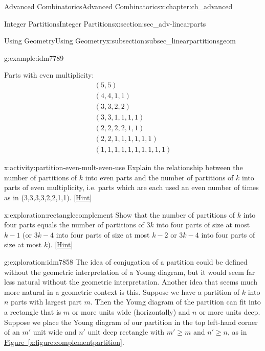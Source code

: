 \documentclass[oneside,10pt,]{book}
\numberwithin{equation}{chapter}
\begin{document}
\begin{chapterptx}{Advanced Combinatorics}{}{Advanced Combinatorics}{}{}{x:chapter:ch_advanced}
\begin{sectionptx}{Integer Partitions}{}{Integer Partitions}{}{}{x:section:sec_adv-linearparts}
\begin{subsectionptx}{Using Geometry}{}{Using Geometry}{}{}{x:subsection:subsec_linearpartitionsgeom}
\begin{introduction}{}
\begin{example}{}{g:example:idm7789}
\begin{sidebyside}{3}{0.0166666666666667}{0.0166666666666667}{0.0333333333333333}
\begin{sbspanel}{0.3}%
\par
Parts with even multiplicity:%
\begin{gather*}
(5,5) \\
(4,4,1,1) \\
(3,3,2,2) \\
(3,3,1,1,1,1) \\
(2,2,2,2,1,1) \\
(2,2,1,1,1,1,1,1) \\
(1,1,1,1,1,1,1,1,1,1) 
\end{gather*}
%
\end{sbspanel}%
\end{sidebyside}%
\end{example}
\begin{activity}{}{x:activity:partition-even-mult-even-use}%
Explain the relationship between the number of partitions of \(k\) into even parts and the number of partitions of \(k\) into parts of even multiplicity, i.e. parts which are each used an even number of times as in (3,3,3,3,2,2,1,1).%
\space\hspace*{0pt}\hfill{\tiny\hyperlink{g:hint:idm7826-back}{[Hint]}}\end{activity}
\begin{exploration}{}{x:exploration:rectanglecomplement}%
Show that the number of partitions of \(k\) into four parts equals the number of partitions of \(3k\) into four parts of size at most \(k-1\) (or \(3k-4\) into four parts of size at most \(k-2\) or \(3k-4\) into four parts of size at most \(k\)).%
\space\hspace*{0pt}\hfill{\tiny\hyperlink{g:hint:idm7842-back}{[Hint]}}\end{exploration}
\begin{exploration}{}{g:exploration:idm7858}%
The idea of conjugation of a partition could be defined without the geometric interpretation of a Young diagram, but it would seem far less natural without the geometric interpretation. Another idea that seems much more natural in a geometric context is this. Suppose we have a partition of \(k\) into \(n\) parts with largest part \(m\). Then the Young diagram of the partition can fit into a rectangle that is \(m\) or more units wide (horizontally) and \(n\) or more units deep. Suppose we place the Young diagram of our partition in the top left-hand corner of an \(m'\) unit wide and \(n'\) unit deep rectangle with \(m'\ge m\) and \(n' \ge n\), as in \hyperref[x:figure:complementpartition]{Figure~\ref{x:figure:complementpartition}}.%

\end{exploration}
\end{introduction}
\end{subsectionptx}
\end{sectionptx}
\end{chapterptx}
\end{document}
